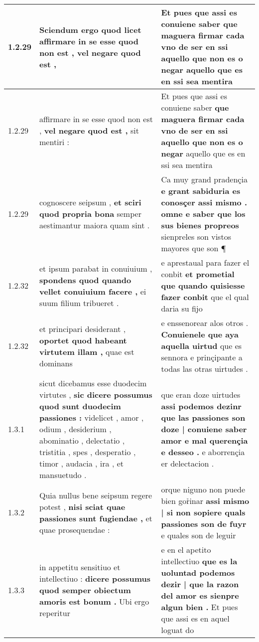 \begin{tabular}{|p{1cm}|p{6.5cm}|p{6.5cm}|}
1.2.29 & Sciendum ergo quod licet \textbf{ affirmare in se esse quod non est , } vel negare quod est , & Et pues que assi es conuiene saber \textbf{ que maguera firmar cada vno de ser en ssi aquello que non es o negar } aquello que es en ssi sea mentira \\\hline
1.2.29 & affirmare in se esse quod non est , \textbf{ vel negare quod est , } sit mentiri : & Et pues que assi es conuiene saber \textbf{ que maguera firmar cada vno de ser en ssi aquello que non es o negar } aquello que es en ssi sea mentira \\\hline
1.2.29 & cognoscere seipsum , \textbf{ et sciri quod propria bona } semper aestimantur maiora quam sint . & Ca muy grand pradençia \textbf{ e grant sabiduria es conosçer assi mismo . omne e saber que los sus bienes propreos } sienpreles son vistos mayores que son ¶ \\\hline
1.2.32 & et ipsum parabat in conuiuium , \textbf{ spondens quod quando vellet conuiuium facere , } ei suum filium tribueret . & e aprestaual para fazer el conbit \textbf{ et prometial que quando quisiesse fazer conbit } que el qual daria su fijo \\\hline
1.2.32 & et principari desiderant , \textbf{ oportet quod habeant virtutem illam , } quae est dominans & e enssenorear alos otros . \textbf{ Conuienele que aya aquella uirtud } que es sennora e prinçipante a todas las otras uirtudes . \\\hline
1.3.1 & sicut dicebamus esse duodecim virtutes , \textbf{ sic dicere possumus quod sunt duodecim passiones : } videlicet , amor , odium , desiderium , abominatio , delectatio , tristitia , spes , desperatio , timor , audacia , ira , et mansuetudo . & que eran doze uirtudes \textbf{ assi podemos dezinr que las passiones son doze | conuiene saber amor e mal querençia e desseo . } e aborrençia er delectacion . \\\hline
1.3.2 & Quia nullus bene seipsum regere potest , \textbf{ nisi sciat quae passiones sunt fugiendae , } et quae prosequendae : & orque niguno non puede bien gor̉inar \textbf{ assi mismo | si non sopiere quals passiones son de fuyr } e quales son de leguir \\\hline
1.3.3 & in appetitu sensitiuo et intellectiuo : \textbf{ dicere possumus quod semper obiectum amoris est bonum . } Ubi ergo reperitur & e en el apetito intellectiuo \textbf{ que es la uoluntad podemos dezir | que la razon del amor es sienpre algun bien . } Et pues que assi es en aquel loguat do \\\hline

\end{tabular}
